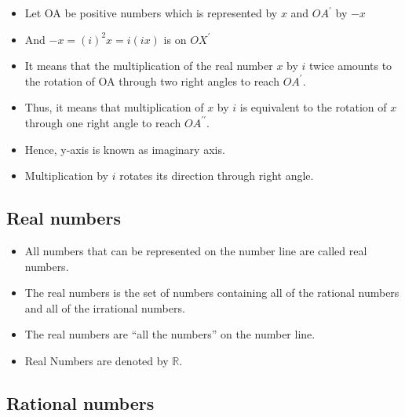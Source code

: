 \documentclass[]{book}
\providecommand{\tightlist}{%
  \setlength{\itemsep}{0pt}\setlength{\parskip}{0pt}}
\begin{document}
\begin{itemize}
\tightlist
\item
  Let OA be positive numbers which is represented by \(x\) and \(OA^\prime\) by \(-x\)
\item
  And \(-x= (i)^2x=i(ix)\) is on \(OX^{\prime}\)
\item
  It means that the multiplication of the real number \(x\) by \(i\) twice amounts to the rotation of OA through two right angles to reach \(OA^\prime\).
\item
  Thus, it means that multiplication of \(x\) by \(i\) is equivalent to the rotation of \(x\) through one right angle to reach \(OA^{\prime\prime}\).
\item
  Hence, y-axis is known as imaginary axis.
\item
  Multiplication by \(i\) rotates its direction through right angle.
\end{itemize}

\hypertarget{real-numbers}{%
\subsection{Real numbers}\label{real-numbers}}

\begin{itemize}
\tightlist
\item
  All numbers that can be represented on the number line are called real numbers.
\item
  The real numbers is the set of numbers containing all of the rational numbers and all of the irrational numbers.
\item
  The real numbers are ``all the numbers'' on the number line.
\item
  Real Numbers are denoted by \(\mathbb{R}\).
\end{itemize}

\hypertarget{rational-numbers}{%
\subsection{Rational numbers}\label{rational-numbers}}
\end{document}
